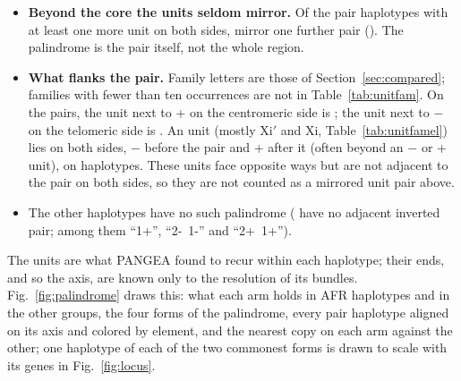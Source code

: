 \begin{itemize}
distance from the axis by a median \palMirror{} kb. Inside its own  unit a copy sits \palRelMin--\palRelMax\% of the
way from the unit's 5\(^\prime\) end (median \palRelMed\%; \palInUnit{} copies inside one  unit), close to that end.
This is why paired copies lie about twice \palDmed{} kb apart. The truncated piece is on \palThreeHap.
\item \textbf{Beyond the core the units seldom mirror.} Of the \palRoom{} pair haplotypes with at least one more
unit on both sides, \palDeeper{} mirror one further pair (\palDeeperHap). The palindrome is the  pair itself, not the whole region.
\item \textbf{What flanks the pair.} Family letters are those of Section~\ref{sec:compared}; families with fewer than ten occurrences are not in Table~\ref{tab:unitfam}. On the \palFlankN{} pairs, the unit next to + on the centromeric side is
\palFlankLText; the unit next to $-$ on the telomeric side is \palFlankRText. An  unit (mostly Xi$'$ and Xi,
Table~\ref{tab:unitfamel}) lies on both sides, $-$ before the pair and + after it (often beyond an $-$ or + unit), on
\palFlankBB{} haplotypes. These  units face opposite ways but are not adjacent to the pair on both sides, so they are
not counted as a mirrored unit pair above.
\item The other \palNoPair{} haplotypes have no such palindrome (\palNoAdj{} have no adjacent inverted  pair; among them \palNoOne{} ``1+'',
\palNoTwoMOneM{} ``2-~1-'' and \palNoTwoPOneP{} ``2+~1+'').
\end{itemize}

The units are what PANGEA found to recur within each haplotype; their ends, and so the axis, are known only to the
resolution of its bundles.
Fig.~\ref{fig:palindrome} draws this: what each arm holds in AFR haplotypes and in the other groups, the four
forms of the palindrome, every pair haplotype aligned on its axis and colored by element, and the nearest copy on each
arm against the other; one haplotype of each of the two commonest forms is drawn to scale with its genes in
Fig.~\ref{fig:locus}.

